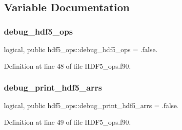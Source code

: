 \subsection{Variable Documentation}
\mbox{\label{namespacehdf5__ops_a9b7c63811a63e9454539f1a2c89678b4}} 
\subsubsection{\texorpdfstring{debug\+\_\+hdf5\+\_\+ops}{debug\_hdf5\_ops}}
{\footnotesize\ttfamily logical, public hdf5\+\_\+ops\+::debug\+\_\+hdf5\+\_\+ops = .false.}



Definition at line 48 of file H\+D\+F5\+\_\+ops.\+f90.

\mbox{\label{namespacehdf5__ops_a00bbaa77652e040350c9726668cc22ac}} 
\subsubsection{\texorpdfstring{debug\+\_\+print\+\_\+hdf5\+\_\+arrs}{debug\_print\_hdf5\_arrs}}
{\footnotesize\ttfamily logical, public hdf5\+\_\+ops\+::debug\+\_\+print\+\_\+hdf5\+\_\+arrs = .false.}



Definition at line 49 of file H\+D\+F5\+\_\+ops.\+f90.

